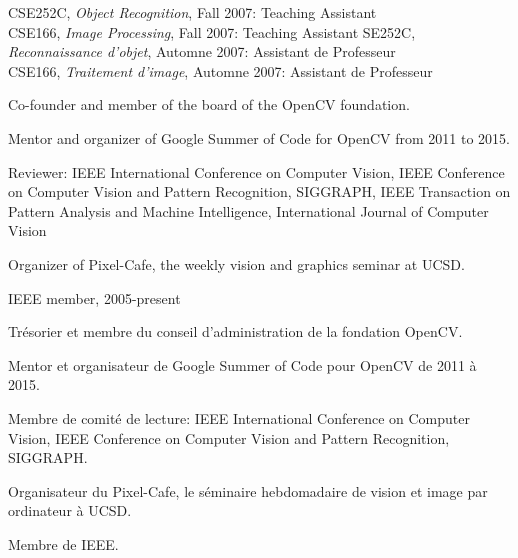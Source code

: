 \documentclass{article}
\begin{document}
\begin{llist}
{
}
{
}
{
CSE252C, {\em Object Recognition}, Fall 2007: Teaching Assistant\\
CSE166, {\em Image Processing}, Fall 2007: Teaching Assistant
}
{
SE252C, {\em Reconnaissance d'objet}, Automne 2007: Assistant de Professeur\\
CSE166, {\em Traitement d'image}, Automne 2007: Assistant de Professeur
}

{

Co-founder and member of the board of the OpenCV foundation.

Mentor and organizer of Google Summer of Code for OpenCV from 2011 to 2015.

Reviewer: IEEE International Conference on Computer Vision, IEEE Conference on Computer Vision and Pattern Recognition, 
SIGGRAPH, IEEE Transaction on Pattern Analysis and Machine Intelligence, International Journal of Computer Vision

Organizer of Pixel-Cafe, the weekly vision and graphics seminar at UCSD.

IEEE member, 2005-present
}
{

Tr\'{e}sorier et membre du conseil d'administration de la fondation OpenCV.

Mentor et organisateur de Google Summer of Code pour OpenCV de 2011 \`{a} 2015.

Membre de comit\'{e} de lecture: IEEE International Conference on Computer Vision, IEEE Conference on Computer Vision 
and Pattern Recognition, SIGGRAPH.

Organisateur du Pixel-Cafe, le s\'{e}minaire hebdomadaire de vision et image par ordinateur \`{a} UCSD.

Membre de IEEE.
}


\end{llist}
\end{document}
